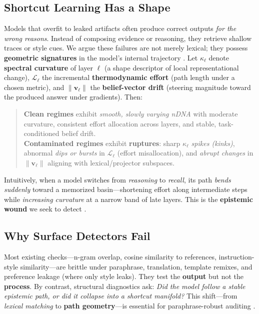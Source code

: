 \documentclass[11pt]{article}
\begin{document}
\subsection{Shortcut Learning Has a Shape}
Models that overfit to leaked artifacts often produce correct outputs \emph{for the wrong reasons}. Instead of composing evidence or reasoning, they retrieve shallow traces or style cues. We argue these failures are not merely lexical; they possess \textbf{geometric signatures} in the model’s internal trajectory \citep{geirhos2020shortcut,mccoy2019right,gururangan2018annotation,nie2020anli,ribeiro2020checklist}. Let $\kappa_\ell$ denote \textbf{spectral curvature} of layer $\ell$ (a shape descriptor of local representational change), $\mathcal{L}_\ell$ the incremental \textbf{thermodynamic effort} (path length under a chosen metric), and $\|\mathbf{v}_\ell\|$ the \textbf{belief-vector drift} (steering magnitude toward the produced answer under gradients). Then:
\begin{quote}
\textbf{Clean regimes} exhibit \emph{smooth, slowly varying nDNA} with moderate curvature, consistent effort allocation across layers, and stable, task-conditioned belief drift. \\
\textbf{Contaminated regimes} exhibit \textbf{ruptures}: sharp $\kappa_\ell$ \emph{spikes (kinks)}, abnormal \emph{dips or bursts} in $\mathcal{L}_\ell$ (effort misallocation), and \emph{abrupt changes} in $\|\mathbf{v}_\ell\|$ aligning with lexical/projector subspaces.
\end{quote}
Intuitively, when a model switches from \emph{reasoning} to \emph{recall}, its path \emph{bends suddenly} toward a memorized basin—shortening effort along intermediate steps while \emph{increasing curvature} at a narrow band of late layers. This is the \textbf{epistemic wound} we seek to detect \citep{raghu2017svcca,kornblith2019cka,ansuini2019intrinsic}.

\subsection{Why Surface Detectors Fail}
Most existing checks—n-gram overlap, cosine similarity to references, instruction-style similarity—are brittle under paraphrase, translation, template remixes, and preference leakage (where only style leaks). They test the \textbf{output} but not the \textbf{process}. By contrast, structural diagnostics ask: \emph{Did the model follow a stable epistemic path, or did it collapse into a shortcut manifold?} This shift—from \emph{lexical matching} to \textbf{path geometry}—is essential for paraphrase-robust auditing \citep{ribeiro2020checklist,iyyer2018scpn,zhao2021calibrate}.
\end{document}
